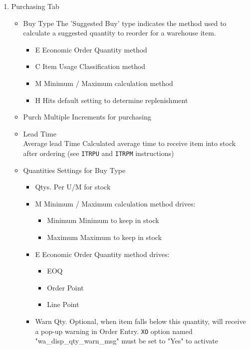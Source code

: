 \begin{enumerate}
	\item Purchasing Tab
	\begin{itemize}
		\item Buy Type \textemdash The 'Suggested Buy' type indicates the method used to calculate a suggested quantity to reorder for a warehouse item.
		\begin{itemize}
			\item E \textemdash Economic Order Quantity method
			\item C \textemdash Item Usage Classification method
			\item M \textemdash Minimum / Maximum calculation method
			\item H \textemdash Hits default setting to determine replenishment
		\end{itemize}
		\item Purch Multiple \textemdash Increments for purchasing
		\item Lead Time\\
		Average lead Time \textemdash Calculated average time to receive item into stock after ordering (see \texttt{ITRPU} and \texttt{ITRPM} instructions)		
		\item Quantities \textemdash Settings for Buy Type
		\begin{itemize}
			\item Qtys. Per \textemdash U/M for stock
			\item M \textemdash Minimum / Maximum calculation method drives:
			\begin{itemize}
				\item Minimum \textemdash Minimum to keep in stock
				\item Maximum \textemdash Maximum to keep in stock
			\end{itemize}
			\item E \textemdash Economic Order Quantity method drives:
			\begin{itemize}
				\item EOQ
				\item Order Point
				\item Line Point
			\end{itemize}
			\item Warn Qty. \textemdash Optional, when item falls below this quantity, will receive a pop-up warning in Order Entry. \texttt{XO} option named "wa\_disp\_qty\_warn\_msg" must be set to "Yes" to activate
		\end{itemize}
	\end{itemize}
	

\end{enumerate}
